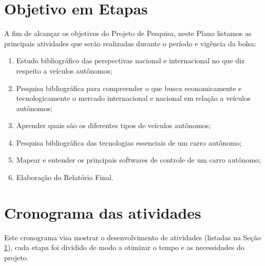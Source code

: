 \documentclass{article}
\begin{document}
\section{Objetivo em Etapas} \label{etapas}
A fim de alcançar os objetivos do Projeto de Pesquisa, neste Plano listamos as principais atividades que serão realizadas durante o período e vigência da bolsa:


\begin{enumerate}
    \item  Estudo bibliográfico das perspectivas nacional e internacional no que diz respeito a veículos autônomos;
    \item  Pesquisa bibliográfica para compreender o que busca economicamente e tecnologicamente o mercado internacional e nacional em relação a veículos autônomos;
    \item Aprender quais são os diferentes tipos de veículos autônomos;
    \item Pesquisa bibliográfica das tecnologias essenciais de um carro autônomo;
    \item Mapear e entender os principais softwares de controle de um carro autônomo;
    \item Elaboração do Relatório Final.
\end{enumerate}

\section{Cronograma das atividades}
Este cronograma visa mostrar o desenvolvimento de atividades (listadas na Seção \ref{etapas}), cada etapa foi dividido de modo a otimizar o tempo e as necessidades do projeto.
\end{document}
